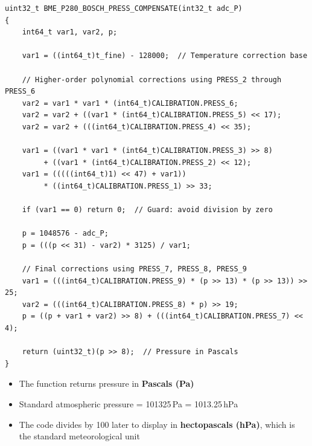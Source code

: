\documentclass[12pt, a4paper]{article}
\begin{document}
\begin{codebox}
\begin{lstlisting}[style=CStyle]
uint32_t BME_P280_BOSCH_PRESS_COMPENSATE(int32_t adc_P)
{
    int64_t var1, var2, p;

    var1 = ((int64_t)t_fine) - 128000;  // Temperature correction base

    // Higher-order polynomial corrections using PRESS_2 through PRESS_6
    var2 = var1 * var1 * (int64_t)CALIBRATION.PRESS_6;
    var2 = var2 + ((var1 * (int64_t)CALIBRATION.PRESS_5) << 17);
    var2 = var2 + (((int64_t)CALIBRATION.PRESS_4) << 35);

    var1 = ((var1 * var1 * (int64_t)CALIBRATION.PRESS_3) >> 8)
         + ((var1 * (int64_t)CALIBRATION.PRESS_2) << 12);
    var1 = (((((int64_t)1) << 47) + var1))
         * ((int64_t)CALIBRATION.PRESS_1) >> 33;

    if (var1 == 0) return 0;  // Guard: avoid division by zero

    p = 1048576 - adc_P;
    p = (((p << 31) - var2) * 3125) / var1;

    // Final corrections using PRESS_7, PRESS_8, PRESS_9
    var1 = (((int64_t)CALIBRATION.PRESS_9) * (p >> 13) * (p >> 13)) >> 25;
    var2 = (((int64_t)CALIBRATION.PRESS_8) * p) >> 19;
    p = ((p + var1 + var2) >> 8) + (((int64_t)CALIBRATION.PRESS_7) << 4);

    return (uint32_t)(p >> 8);  // Pressure in Pascals
}
\end{lstlisting}
\end{codebox}

\begin{tipbox}
\begin{itemize}[leftmargin=1.5em]
    \item The function returns pressure in \textbf{Pascals (Pa)}
    \item Standard atmospheric pressure = 101325\,Pa = 1013.25\,hPa
    \item The code divides by 100 later to display in \textbf{hectopascals (hPa)}, which is the standard meteorological unit
\end{itemize}
\end{tipbox}

\end{document}
